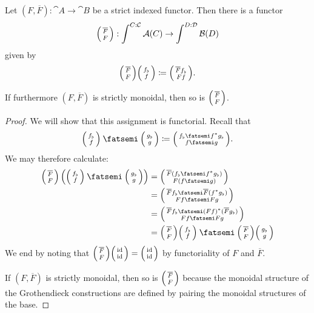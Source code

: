 \documentclass[DynamicalBook]{subfiles}
\begin{document}
\begin{proposition}\label{prop.functoriality_monoidal_groth}
  Let $(F, \overline{F}) : \cat{A} \to \cat{B}$ be a strict indexed functor.
  Then there is a functor 
\[
\lens{\overline{F}}{F} : \int^{C : \cat{C}}\cat{A}(C) \to \int^{D : \cat{D}}\cat{B}(D)
\]
given by
$$\lens{\overline{F}}{F}\lens{f_{\flat}}{f} \coloneqq
\lens{\overline{F}f_{\flat}}{Ff}.$$ 

If furthermore $(F, \overline{F})$ is strictly monoidal, then so is $\lens{\overline{F}}{F}$.
\end{proposition}
\begin{proof}
We will show that this assignment is functorial. Recall that 
\[
\lens{f_{\flat}}{f} \then \lens{g_{\flat}}{g} \coloneqq \lens{f_{\flat} \then
  f^{\ast}g_{\flat}}{f \then g}.
\]
We may therefore calculate:
\begin{align*}
\lens{\overline{F}}{F}\left(\lens{f_{\flat}}{f} \then \lens{g_{\flat}}{g}  \right) &= \lens{\overline{F}(f_{\flat} \then f^{\ast}g_{\flat})}{F(f \then g)}\\
&= \lens{\overline{F}f_{\flat}\then \overline{F}(f^{\ast}g_{\flat})}{Ff \then Fg}\\
&= \lens{\overline{F}f_{\flat} \then (Ff)^{\ast}(\overline{F}g_{\flat})}{Ff \then Fg}\\
&= \lens{\overline{F}}{F}\lens{f_{\flat}}{f} \then \lens{\overline{F}}{F}\lens{g_{\flat}}{g}
\end{align*}
We end by noting that $\lens{\overline{F}}{F}\lens{\id}{\id} = \lens{\id}{\id}$
by functoriality of $F$ and $\overline{F}$.

If $(F, \overline{F})$ is strictly monoidal, then so is $\lens{\overline{F}}{F}$
because the monoidal structure of the Grothendieck constructions are defined by
pairing the monoidal structures of the base.
\end{proof}
\end{document}
